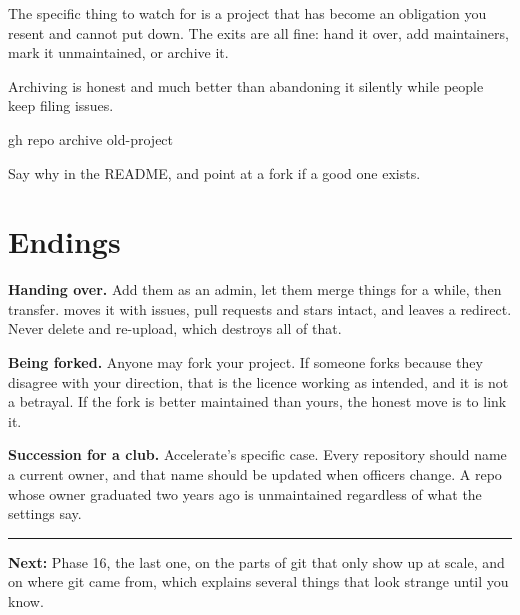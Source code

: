 \documentclass[11pt]{article}
\begin{document}
\begin{trap}
The specific thing to watch for is a project that has become an obligation you
resent and cannot put down. The exits are all fine: hand it over, add maintainers,
mark it unmaintained, or archive it.

Archiving is honest and much better than abandoning it silently while people keep
filing issues.

\begin{shell}
gh repo archive old-project
\end{shell}

Say why in the README, and point at a fork if a good one exists.
\end{trap}

\section{Endings}

\textbf{Handing over.} Add them as an admin, let them merge things for a while, then
transfer.  moves it with issues, pull requests and
stars intact, and leaves a redirect. Never delete and re-upload, which destroys all
of that.

\textbf{Being forked.} Anyone may fork your project. If someone forks because they
disagree with your direction, that is the licence working as intended, and it is not
a betrayal. If the fork is better maintained than yours, the honest move is to link
it.

\textbf{Succession for a club.} Accelerate's specific case. Every repository should
name a current owner, and that name should be updated when officers change. A repo
whose owner graduated two years ago is unmaintained regardless of what the settings
say.


\vspace{1em}
{\color{rhborder}\rule{\linewidth}{0.8pt}}

\textbf{Next:} Phase 16, the last one, on the parts of git that only show up at
scale, and on where git came from, which explains several things that look strange
until you know.
\end{document}
